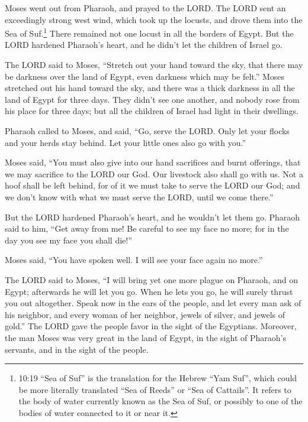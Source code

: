 \myverse{}Moses went out from Pharaoh, and prayed to the LORD.
\myverse{}The LORD sent an exceedingly strong west wind, which took up the locusts,
and drove them into the Sea of Suf.\footnote{10:19 “Sea of Suf” is the translation for the Hebrew “Yam Suf”, which could be more literally translated “Sea of Reeds” or “Sea of Cattails”. It refers to the body of water currently known as the Sea of Suf, or possibly to one of the bodies of water connected to it or near it.} There remained not one locust in all the borders of Egypt.
\myverse{}But the LORD hardened Pharaoh’s heart, and he didn’t let the children of
Israel go.


\myverse{}The LORD said to Moses, “Stretch out your hand toward the sky,
that there may be darkness over the land of Egypt, even darkness which may be felt.”
\myverse{}Moses stretched out his hand toward the sky, and there was a thick darkness
in all the land of Egypt for three days.
\myverse{}They didn’t see one another, and nobody rose from his place for three days;
but all the children of Israel had light in their dwellings.


\myverse{}Pharaoh called to Moses, and said, “Go, serve the LORD. Only
let your flocks and your herds stay behind. Let your little ones also go with you.”


\myverse{}Moses said, “You must also give into our hand sacrifices and
burnt offerings, that we may sacrifice to the LORD our God.
\myverse{}Our livestock also shall go with us. Not a hoof shall be left behind, for
of it we must take to serve the LORD our God; and we don’t know with what we must serve the LORD, until
we come there.”


\myverse{}But the LORD hardened Pharaoh’s heart, and he wouldn’t let them
go.
\myverse{}Pharaoh said to him, “Get away from me! Be careful to see my face no more;
for in the day you see my face you shall die!”


\myverse{}Moses said, “You have spoken well. I will see your face again
no more.”


\mychapter{} \myverse*{}The LORD said to Moses, “I will bring yet one more plague on Pharaoh,
and on Egypt; afterwards he will let you go. When he lets you go, he will surely thrust you out altogether.
\myverse{}Speak now in the ears of the people, and let every man ask of his neighbor,
and every woman of her neighbor, jewels of silver, and jewels of gold.”
\myverse{}The LORD gave the people favor in the sight of the Egyptians. Moreover, the
man Moses was very great in the land of Egypt, in the sight of Pharaoh’s servants, and in the sight of
the people.


